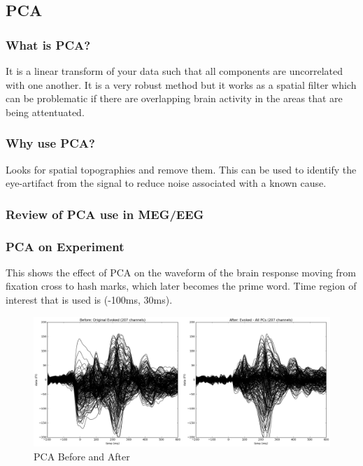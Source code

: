 \documentclass[english]{article}
\begin{document}
\subsection{PCA}
\subsubsection{What is PCA?}
It is a linear transform of your data such that all components are uncorrelated
with one another. It is a very robust method but it works as a spatial filter
which can be problematic if there are overlapping brain activity in the areas
that are being attentuated.

\subsubsection{Why use PCA?}
Looks for spatial topographies and remove them. This can be used to identify
the eye-artifact from the signal to reduce noise associated with a known cause.

\subsubsection{Review of PCA use in MEG/EEG}
\subsubsection{PCA on Experiment}
This shows the effect of PCA on the waveform of the brain response moving from
fixation cross to hash marks, which later becomes the prime word.
Time region of interest that is used is (-100ms, 30ms).

\begin{figure}[H]
\begin{centering}
\includegraphics[scale=0.33]{pca-before_after}
\par\end{centering}
\caption{\label{fig:pca-b_a} PCA Before and After}
\end{figure}
\end{document}
